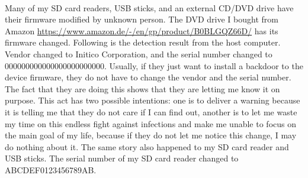 \documentclass[mscthesis]{usiinfthesis}
\begin{document}
\paragraph{}
Many of my SD card readers, USB sticks, and an external CD/DVD drive have their firmware modified by unknown person. The DVD drive I bought from Amazon \url{https://www.amazon.de/-/en/gp/product/B0BLGQZ66D/} has its firmware changed. Following is the detection result from the host computer. Vendor changed to Initico Corporation, and the serial number changed to 000000000000000000000000. Usually, if they just want to install a backdoor to the device firmware, they do not have to change the vendor and the serial number. The fact that they are doing this shows that they are letting me know it on purpose. This act has two possible intentions: one is to deliver a warning because it is telling me that they do not care if I can find out, another is to let me waste my time on this endless fight against infections and make me unable to focus on the main goal of my life, because if they do not let me notice this change, I may do nothing about it. The same story also happened to my SD card reader and USB sticks. The serial number of my SD card reader changed to ABCDEF0123456789AB.
\end{document}
